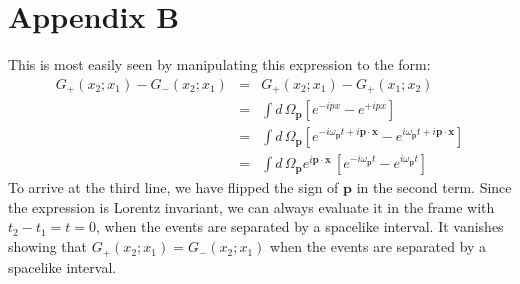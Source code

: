 \documentclass[12pt]{article}
\begin{document}
\section{Appendix B}
\label{sec:equalgs}
This is most easily seen by manipulating this expression to the form:
\begin{eqnarray}
\label{delta}
G_+(x_2;x_1) - G_-(x_2;x_1) &=&
 G_+(x_2;x_1) - G_+(x_1;x_2)\\
 &=&\int d\,\Omega_{\bm{p}} [e^{-ipx} - e^{+ipx}]\\
&=&\int d\,\Omega_{\bm{p}} [ e^{-i\omega_{\bm{p}} t+ i\bm{p\cdot x}} -  e^{i\omega_{\bm{p}} t+ i\bm{p\cdot x}}]\nonumber\\
&=&\int d\,\Omega_{\bm{p}} e^{i\bm{p\cdot x}}\, [e^{-i\omega_{\bm{p}} t} - e^{i\omega_{\bm{p}} t}]\nonumber
\end{eqnarray} 
To arrive at the third line, we have flipped the sign of $\bm p$ in the second term.
Since the expression is  Lorentz invariant, we can always evaluate it in the frame with $t_2-t_1=t=0$, when the events are separated by a spacelike interval. It vanishes showing that $G_+(x_2;x_1) = G_-(x_2;x_1)$ when the events are separated by a spacelike interval.
\end{document}
